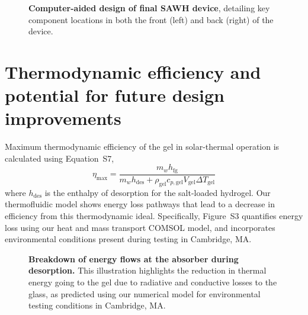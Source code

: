 \documentclass[11pt]{article}
\begin{document}
\begin{figure}[t]
\centering
{}
\caption{\textbf{Computer-aided design of final SAWH device}, detailing key component locations in both the front (left) and back (right) of the device.}
\label{fig:S2}
\end{figure}

\section{Thermodynamic efficiency and potential for future design improvements}

Maximum thermodynamic efficiency of the gel in solar-thermal operation is calculated using Equation~S7,
\begin{equation}
\eta_{\mathrm{max}} = \frac{m_w h_{\mathrm{fg}}}{m_w h_{\mathrm{des}} + \rho_{\mathrm{gel}} c_{p,\mathrm{gel}} V_{\mathrm{gel}} \Delta T_{\mathrm{gel}}}
\end{equation}
where $h_{\mathrm{des}}$ is the enthalpy of desorption for the salt-loaded hydrogel. Our thermofluidic model shows energy loss pathways that lead to a decrease in efficiency from this thermodynamic ideal. Specifically, Figure~S3 quantifies energy loss using our heat and mass transport COMSOL model, and incorporates environmental conditions present during testing in Cambridge, MA.

\begin{figure}[h]
\centering
{}
\caption{\textbf{Breakdown of energy flows at the absorber during desorption.} This illustration highlights the reduction in thermal energy going to the gel due to radiative and conductive losses to the glass, as predicted using our numerical model for environmental testing conditions in Cambridge, MA.}
\label{fig:S3}
\end{figure}
\end{document}
